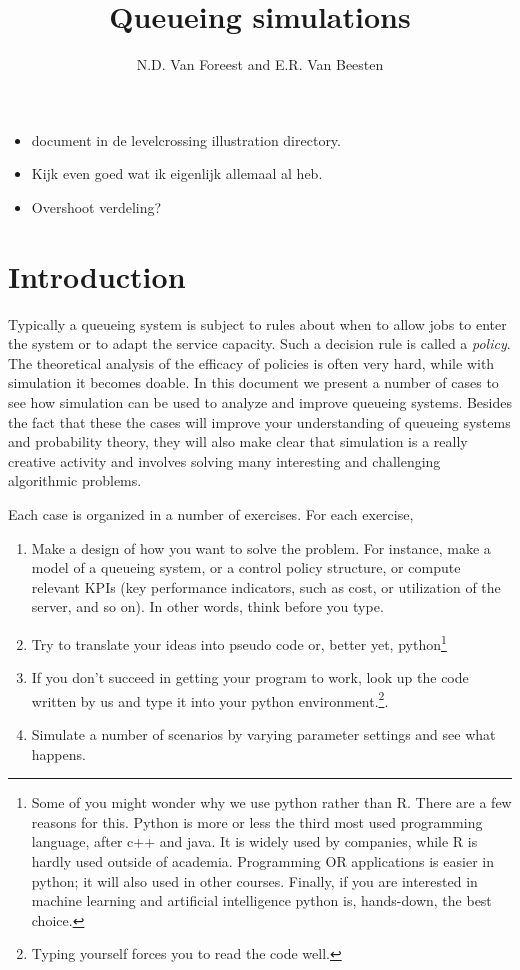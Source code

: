 \documentclass{scrartcl}
\title{Queueing simulations}
\author{N.D. Van Foreest and E.R. Van Beesten}
\begin{document}
\maketitle

\begin{itemize}
\item document in de levelcrossing illustration directory. 
\item Kijk even goed wat ik eigenlijk allemaal al heb.
\item Overshoot verdeling? 
\end{itemize}


\section{Introduction}

Typically a queueing system is subject to rules about when to allow jobs to enter the system or to adapt the service capacity. Such a decision rule is called a \emph{policy}.  The theoretical analysis of the efficacy of policies is often very hard, while with simulation it becomes doable.  In this document we present a number of cases to see how simulation can be used to analyze and improve queueing systems. Besides the fact that these the cases will improve your understanding of queueing systems and probability theory, they will also make clear  that simulation is a really creative activity and involves solving many interesting and challenging  algorithmic problems.  


Each case is organized in a number of exercises. For each exercise,
\begin{enumerate}
\item Make a design of how you want to solve the problem. For instance, make a model of a queueing system, or a control policy structure, or compute relevant KPIs (key performance indicators, such as cost, or utilization of the server, and so on). In other words, think before you type. 
\item Try to translate your ideas into pseudo code or, better yet,  python\footnote{Some of you might wonder why we use python rather than R. There are a few reasons for this. Python is more or less the third most used programming language, after c++ and java. It is widely used by companies, while R is hardly  used outside of academia. Programming OR applications is easier in python; it will also used in other courses. Finally, if you are interested in machine learning and artificial intelligence python is, hands-down, the best choice.}
  \item If you don't succeed in getting your program to work,  look up the code written by us and type it into your python environment.\footnote{Typing yourself forces you to read the code well.}.
  \item Simulate a number of scenarios by varying parameter settings and see what happens.
\end{enumerate}
\end{document}
